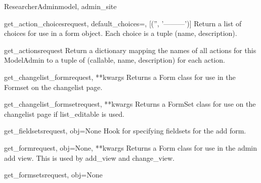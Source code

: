 \documentclass[letterpaper,10pt,english]{sphinxmanual}
\begin{document}
\begin{classdesc}{ResearcherAdmin}{model, admin\_site}
\hypertarget{data.admin.ResearcherAdmin.get_action_choices}{}\begin{methoddesc}{get\_action\_choices}{request, default\_choices=, {[}('', '---------'){]}}
Return a list of choices for use in a form object.  Each choice is a
tuple (name, description).
\end{methoddesc}

\hypertarget{data.admin.ResearcherAdmin.get_actions}{}\begin{methoddesc}{get\_actions}{request}
Return a dictionary mapping the names of all actions for this
ModelAdmin to a tuple of (callable, name, description) for each action.
\end{methoddesc}

\hypertarget{data.admin.ResearcherAdmin.get_changelist_form}{}\begin{methoddesc}{get\_changelist\_form}{request, **kwargs}
Returns a Form class for use in the Formset on the changelist page.
\end{methoddesc}

\hypertarget{data.admin.ResearcherAdmin.get_changelist_formset}{}\begin{methoddesc}{get\_changelist\_formset}{request, **kwargs}
Returns a FormSet class for use on the changelist page if list\_editable
is used.
\end{methoddesc}

\hypertarget{data.admin.ResearcherAdmin.get_fieldsets}{}\begin{methoddesc}{get\_fieldsets}{request, obj=None}
Hook for specifying fieldsets for the add form.
\end{methoddesc}

\hypertarget{data.admin.ResearcherAdmin.get_form}{}\begin{methoddesc}{get\_form}{request, obj=None, **kwargs}
Returns a Form class for use in the admin add view. This is used by
add\_view and change\_view.
\end{methoddesc}

\hypertarget{data.admin.ResearcherAdmin.get_formsets}{}\begin{methoddesc}{get\_formsets}{request, obj=None}\end{methoddesc}


\end{classdesc}
\end{document}
